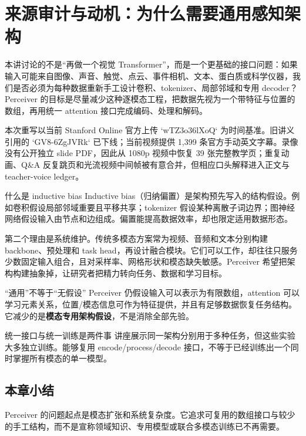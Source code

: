 \section{来源审计与动机：为什么需要通用感知架构}

本讲讨论的不是“再做一个视觉 Transformer”，而是一个更基础的接口问题：如果输入可能来自图像、声音、触觉、点云、事件相机、文本、蛋白质或科学仪器，我们是否必须为每种数据重新手工设计卷积、tokenizer、局部邻域和专用 decoder？Perceiver 的目标是尽量减少这种逐模态工程，把数据先视为一个带特征与位置的数组，再用统一 attention 接口完成编码、处理和解码。

本次重写以当前 Stanford Online 官方上传 `wTZ3o36lXoQ` 为时间基准。旧讲义引用的 `GV8-6ZgJVRk` 已下线；当前视频提供 1,399 条官方手动英文字幕。录像没有公开独立 slide PDF，因此从 1080p 视频中恢复 39 张完整教学页；重复动画、Q\&A 反复跳页和光流视频中间帧被有意合并，但相应口头解释进入正文与 teacher-voice ledger。


\begin{knowledgebox}{什么是 inductive bias}
Inductive bias（归纳偏置）是架构预先写入的结构假设。例如卷积假设局部邻域重要且平移共享；tokenizer 假设某种离散子词边界；图神经网络假设输入由节点和边组成。偏置能提高数据效率，却也限定适用数据形态。
\end{knowledgebox}


第二个理由是系统维护。传统多模态方案常为视频、音频和文本分别构建 backbone、预处理和 task head，再设计融合模块。它们可以工作，却往往只服务少数固定输入组合，且对采样率、网格形状和模态缺失敏感。Perceiver 希望把架构构建抽象掉，让研究者把精力转向任务、数据和学习目标。


\begin{importantbox}{“通用”不等于“无假设”}
Perceiver 仍假设输入可以表示为有限数组，attention 可以学习元素关系，位置/模态信息可作为特征提供，并且有足够数据恢复任务结构。它减少的是\textbf{模态专用架构假设}，不是消除全部先验。
\end{importantbox}

\begin{warningbox}{统一接口与统一训练是两件事}
讲座展示同一架构分别用于多种任务，但这些实验大多独立训练。能够复用 encode/process/decode 接口，不等于已经训练出一个同时掌握所有模态的单一模型。
\end{warningbox}

\subsection{本章小结}

Perceiver 的问题起点是模态扩张和系统复杂度。它追求可复用的数组接口与较少的手工结构，而不是宣称领域知识、专用模型或联合多模态训练已不再需要。

